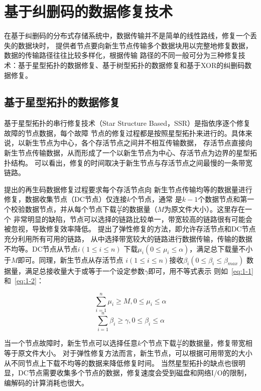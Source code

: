 \section{基于纠删码的数据修复技术}
在基于纠删码的分布式存储系统中，数据传输并不是简单的线性路线，修复一个丢失的数据块时，
提供者节点要向新生节点传输多个数据块用以完整地修复数据，数据的传输路径往往比较多样化，根据传输
路径的不同一般可分为三种修复技术：基于星型拓扑的数据修复、基于树型拓扑的数据修复和基于XOR的纠删码数据修复。

\subsection{基于星型拓扑的数据修复}
基于星型拓扑的串行修复技术（Star Structure Based，SSR）是指依序逐个修复故障的节点数据，每个故障
节点的修复过程都是按照星型拓扑来进行的。具体来说，以新生节点为中心，各个存活节点之间并不相互传输数据，
存活节点直接向新生节点传输数据，从而形成了一个以新生节点为中心、存活节点为边界的星型拓扑结构。
可以看出，修复的时间取决于新生节点与存活节点之间最慢的一条带宽链路。

\citet{dimakis2010network,wu2007deterministic}提出的再生码数据修复过程要求每个存活节点向
新生节点传输均等的数据量进行修复，数据收集节点（DC节点）仅连接$k$个节点，通常
是$k-1$个数据节点和第一个校验数据节点，并从每个节点下载$\frac{M}{k}$的数据量（$M$为原文件大小）。这里存在一个
非常明显的缺陷，节点可以选择的链路比较单一，带宽较高的链路很有可能会被忽视，导致修复效率降低。
\citet{shah2010flexible}提出了弹性修复的方法，即允许存活节点和DC节点充分利用所有可用的链路，
从中选择带宽较大的链路进行数据传输，传输的数据不均等。DC节点从节点$i(1 \leqslant i \leqslant n)$
下载$\mu_i (0 \leqslant \mu_i \leqslant \alpha)$，满足总下载量不小于$M$即可。同理，新生节点从存活节点
$i(1 \leqslant i \leqslant n)$接收$\beta_i (0 \leqslant \beta_i \leqslant \beta_{max})$
数据量，满足总接收量大于或等于一个设定参数$\gamma$即可，用不等式表示
则如~\ref{eq:1-1}和~\ref{eq:1-2}：

\begin{equation}
	\label{eq:1-1}
	\sum_{i=1}^{n} \mu_{i} \geq M, 0 \leq \mu_{i} \leq \alpha
\end{equation}
\begin{equation}
	\label{eq:1-2}
	\sum_{i=1}^{n} \beta_{i} \geq \gamma, 0 \leq \beta_{i} \leq \alpha
\end{equation}

当一个节点故障时，新生节点可以选择任意$k$个节点下载$\frac{M}{k}$的数据量，修复带宽相等于原文件大小。
对于弹性修复方法而言，新生节点，可以根据可用带宽的大小从不同节点上下载不均等的数据来降低修复时间。
当然星型拓扑的缺点也很明显，DC节点需要收集多个节点的数据，修复速度会受到磁盘和网络I/O的限制，编解码的计算消耗也很大。

